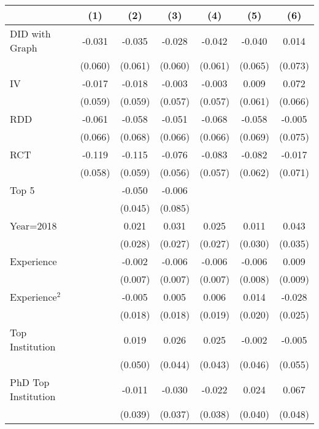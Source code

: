 \begin{tabular}{l*{6}{c}}
\hline\hline
                &\multicolumn{1}{c}{(1)}&\multicolumn{1}{c}{(2)}&\multicolumn{1}{c}{(3)}&\multicolumn{1}{c}{(4)}&\multicolumn{1}{c}{(5)}&\multicolumn{1}{c}{(6)}\\
\hline
DID with Graph  &   -0.031&   -0.035&   -0.028&   -0.042&   -0.040&    0.014\\
                &  (0.060)&  (0.061)&  (0.060)&  (0.061)&  (0.065)&  (0.073)\\
IV              &   -0.017&   -0.018&   -0.003&   -0.003&    0.009&    0.072\\
                &  (0.059)&  (0.059)&  (0.057)&  (0.057)&  (0.061)&  (0.066)\\
RDD             &   -0.061&   -0.058&   -0.051&   -0.068&   -0.058&   -0.005\\
                &  (0.066)&  (0.068)&  (0.066)&  (0.066)&  (0.069)&  (0.075)\\
RCT             &   -0.119&   -0.115&   -0.076&   -0.083&   -0.082&   -0.017\\
                &  (0.058)&  (0.059)&  (0.056)&  (0.057)&  (0.062)&  (0.071)\\
Top 5           &         &   -0.050&   -0.006&         &         &         \\
                &         &  (0.045)&  (0.085)&         &         &         \\
Year=2018       &         &    0.021&    0.031&    0.025&    0.011&    0.043\\
                &         &  (0.028)&  (0.027)&  (0.027)&  (0.030)&  (0.035)\\
Experience      &         &   -0.002&   -0.006&   -0.006&   -0.006&    0.009\\
                &         &  (0.007)&  (0.007)&  (0.007)&  (0.008)&  (0.009)\\
Experience$^2$  &         &   -0.005&    0.005&    0.006&    0.014&   -0.028\\
                &         &  (0.018)&  (0.018)&  (0.019)&  (0.020)&  (0.025)\\
Top Institution &         &    0.019&    0.026&    0.025&   -0.002&   -0.005\\
                &         &  (0.050)&  (0.044)&  (0.043)&  (0.046)&  (0.055)\\
PhD Top Institution&         &   -0.011&   -0.030&   -0.022&    0.024&    0.067\\
                &         &  (0.039)&  (0.037)&  (0.038)&  (0.040)&  (0.048)\\

\end{tabular}
